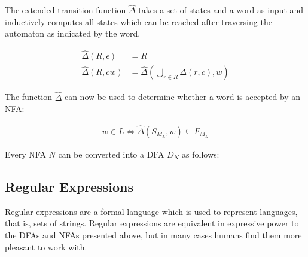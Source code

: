 \begin{definition}
    The extended transition function $\hat\Delta$ takes a set of states and a
    word as input and inductively computes all states which can be reached
    after traversing the automaton as indicated by the word.

    \begin{align}
        \hat\Delta(R, \epsilon) &= R \\
        \hat\Delta(R, c w) &= \hat\Delta(\bigcup\limits_{r \in R} \Delta(r, c), w)
    \end{align}
\end{definition}

The function $\hat\Delta$ can now be used to determine whether a word is accepted by an NFA:

\begin{align}
    w \in L \Leftrightarrow \hat\Delta(S_{M_L}, w) \subseteq F_{M_L}
\end{align}

\begin{definition}
    Every NFA $N$ can be converted into a DFA $D_N$ as follows:
\end{definition}

\begin{definition}

\end{definition}

\subsection{Regular Expressions}

Regular expressions are a formal language which is used to represent languages, that is, sets of strings.
Regular expressions are equivalent in expressive power to the DFAs and NFAs presented above,
but in many cases humans find them more pleasant to work with.

